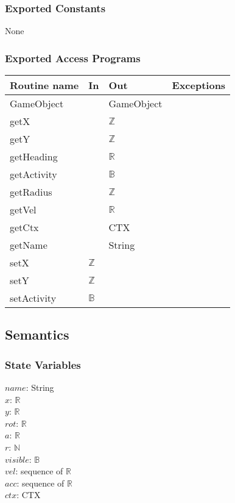 \documentclass[12pt]{article}
\begin{document}
\subsubsection*{Exported Constants}

None

\subsubsection*{Exported Access Programs}

\begin{tabular}{| l | l | l | l |}
    \hline
    \textbf{Routine name} & \textbf{In} & \textbf{Out} & \textbf{Exceptions}\\
    \hline
    GameObject & ~ & GameObject & ~\\
    \hline
    getX & ~ & $\mathbb{Z}$ & ~\\
    \hline
    getY & ~ & $\mathbb{Z}$ & ~\\
    \hline
    getHeading & ~ & $\mathbb{R}$ & ~\\
    \hline
    getActivity & ~ & $\mathbb{B}$ & ~\\
    \hline
    getRadius & ~ & $\mathbb{Z}$ & ~\\
    \hline
    getVel & ~ & $\mathbb{R}$ & ~\\
    \hline
    getCtx & ~ & CTX & ~\\
    \hline
    getName & ~ & String & ~\\
    \hline
    setX & $\mathbb{Z}$ & ~ & ~\\
    \hline
    setY & $\mathbb{Z}$ & ~ & ~\\
    \hline
    setActivity & $\mathbb{B}$ & ~ & ~\\
    \hline
\end{tabular}

\subsection* {Semantics}

\subsubsection* {State Variables}

$name$: String\\
$x$: $\mathbb{R}$\\
$y$: $\mathbb{R}$\\
$rot$: $\mathbb{R}$\\
$a$: $\mathbb{R}$\\
$r$: $\mathbb{N}$\\
$visible$: $\mathbb{B}$\\
$vel$: sequence of $\mathbb{R}$\\
$acc$: sequence of $\mathbb{R}$\\
$ctx$: CTX\\
\end{document}
